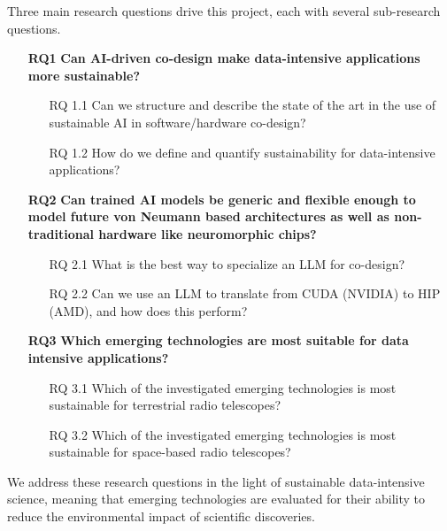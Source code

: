 \documentclass[a4wide,twocolumn]{article}
\begin{document}
Three main research questions drive this project, each with several sub-research questions.

\begin{itemize} 
\item[\textbf{RQ1}] \textbf{Can AI-driven co-design make data-intensive applications more sustainable?}
    \begin{itemize} 
    \item[RQ 1.1] Can we structure and describe the state of the art in the use of sustainable AI in software/hardware co-design?
    \item[RQ 1.2] How do we define and quantify sustainability for data-intensive applications? 
    \end{itemize}
\item[\textbf{RQ2}] \textbf{Can trained AI models be generic and flexible enough to model future von Neumann based
architectures as well as non-traditional hardware like neuromorphic chips?}
    \begin{itemize} 
    \item[RQ 2.1] What is the best way to specialize an LLM for co-design? 
    \item[RQ 2.2] Can we use an LLM to translate from CUDA (NVIDIA) to HIP (AMD), and how does this perform? 
    \end{itemize}
\item[\textbf{RQ3}] \textbf{Which emerging technologies are most suitable for data intensive applications?}
    \begin{itemize} 
    \item[RQ 3.1] Which of the investigated emerging technologies is most sustainable for terrestrial radio telescopes?
    \item[RQ 3.2] Which of the investigated emerging technologies is most sustainable for space-based radio telescopes? 
    \end{itemize}
\end{itemize}

We address these research questions in the light of sustainable data-intensive science, meaning that emerging technologies are evaluated for their ability to reduce the environmental impact of scientific discoveries.
\end{document}
